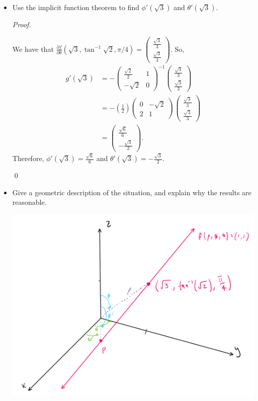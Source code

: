 \documentclass[12pt]{article}
\newenvironment{problem}[2][Problem]{\begin{trivlist}
\item[\hskip \labelsep {\bfseries #1}\hskip \labelsep {\bfseries #2.}]}{\end{trivlist}}
\newenvironment{sol}
    {\emph{Proof.}
    }
    {
    \qed
    }
\begin{document}
\begin{problem}{23}
\begin{itemize}
    \item[(b)] Use the implicit function theorem to find $\phi'(\sqrt{3})$ and $\theta'(\sqrt{3})$.
    
    \begin{sol}
    We have that $\frac{\partial f}{\partial \theta}(\sqrt{3},\tan^{-1}\sqrt{2}, \pi/4) = \begin{pmatrix} \frac{\sqrt{3}}{3} \\ \frac{\sqrt{3}}{3} \end{pmatrix}$. So, \begin{align*}
        g'(\sqrt{3}) &= -\begin{pmatrix}
\frac{\sqrt{2}}{2} & 1 \\ 
-\sqrt{2} & 0
\end{pmatrix}^{-1} \begin{pmatrix} \frac{\sqrt{3}}{3} \\ \frac{\sqrt{3}}{3} \end{pmatrix} \\ &= -\left( \frac{1}{2} \right)\begin{pmatrix}
0 & -\sqrt{2} \\ 
2 & 1
\end{pmatrix}\begin{pmatrix} \frac{\sqrt{3}}{3} \\ \frac{\sqrt{3}}{3} \end{pmatrix} \\ &= \begin{pmatrix} \frac{\sqrt{6}}{6} \\ -\frac{\sqrt{3}}{2} \end{pmatrix}.
    \end{align*}
    Therefore, $\phi'(\sqrt{3}) = \frac{\sqrt{6}}{6}$ and $\theta'(\sqrt{3}) = -\frac{\sqrt{3}}{2}$.
    \end{sol}
    
    \item[(c)] Give a geometric description of the situation, and explain why the results are reasonable.
    
    \begin{center}
    \includegraphics[scale=.5]{hw 6 (1).PNG}
    \end{center}
    

\end{itemize}
\end{problem}
\end{document}
